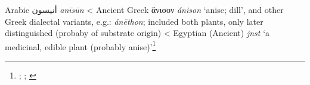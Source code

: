 \begin{etymology}\label{ety:anisun}
Arabic {أنيسون} \textit{anīsūn}
< Ancient Greek {ἄνισον} \textit{ánison} `anise; dill', and other Greek dialectal variants, e.g.: \textit{ánēthon}; included both plants, only later distinguished (probaby of substrate origin)
< Egyptian (Ancient) \textit{jnst} `a medicinal, edible plant (probably anise)'\footnote{\textcite{wehr_dictionary_1976}; \textcite{liddell_greek-english_1940}; \textcite[99]{erman_worterbuch_1926}}
\end{etymology}